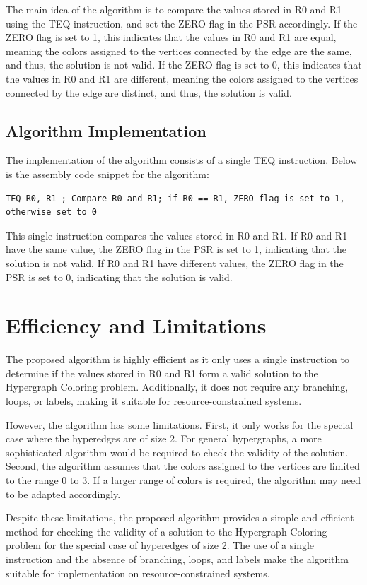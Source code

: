 The main idea of the algorithm is to compare the values stored in R0 and R1 using the TEQ instruction, and set the ZERO flag in the PSR accordingly. If the ZERO flag is set to 1, this indicates that the values in R0 and R1 are equal, meaning the colors assigned to the vertices connected by the edge are the same, and thus, the solution is not valid. If the ZERO flag is set to 0, this indicates that the values in R0 and R1 are different, meaning the colors assigned to the vertices connected by the edge are distinct, and thus, the solution is valid.

\subsection{Algorithm Implementation}
The implementation of the algorithm consists of a single TEQ instruction. Below is the assembly code snippet for the algorithm:

\begin{verbatim}
TEQ R0, R1 ; Compare R0 and R1; if R0 == R1, ZERO flag is set to 1, otherwise set to 0
\end{verbatim}

This single instruction compares the values stored in R0 and R1. If R0 and R1 have the same value, the ZERO flag in the PSR is set to 1, indicating that the solution is not valid. If R0 and R1 have different values, the ZERO flag in the PSR is set to 0, indicating that the solution is valid.

\section{Efficiency and Limitations}
The proposed algorithm is highly efficient as it only uses a single instruction to determine if the values stored in R0 and R1 form a valid solution to the Hypergraph Coloring problem. Additionally, it does not require any branching, loops, or labels, making it suitable for resource-constrained systems.

However, the algorithm has some limitations. First, it only works for the special case where the hyperedges are of size 2. For general hypergraphs, a more sophisticated algorithm would be required to check the validity of the solution. Second, the algorithm assumes that the colors assigned to the vertices are limited to the range 0 to 3. If a larger range of colors is required, the algorithm may need to be adapted accordingly.

Despite these limitations, the proposed algorithm provides a simple and efficient method for checking the validity of a solution to the Hypergraph Coloring problem for the special case of hyperedges of size 2. The use of a single instruction and the absence of branching, loops, and labels make the algorithm suitable for implementation on resource-constrained systems.



